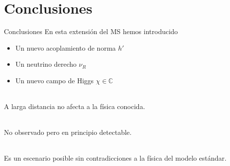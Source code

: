 \documentclass[14pt]{beamer}
\begin{document}
\section{Conclusiones}
\begin{frame}{Conclusiones}
En esta extensión del MS hemos introducido
\begin{itemize}
	\item Un nuevo acoplamiento de norma $h'$ 
	\item Un neutrino derecho $\nu_R$
	\item Un nuevo campo de Higgs $\chi\in\mathbb{C}$ \\~\

\end{itemize}


A larga distancia no afecta a la física conocida.\\~\

No observado pero en principio detectable. \\~\

Es un escenario posible sin contradicciones a la física del modelo estándar.


\end{frame}

\end{document}
